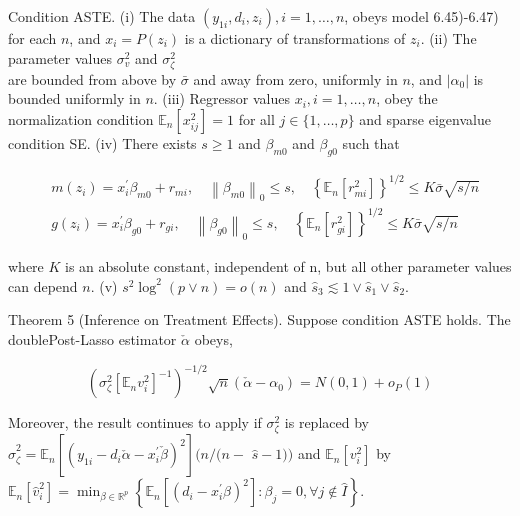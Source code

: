 \documentclass[10pt]{article}
\begin{document}
Condition ASTE. (i) The data \(\left(y_{1 i}, d_{i}, z_{i}\right), i=1, \ldots, n\), obeys model 6.45)-6.47) for each \(n\), and \(x_{i}=P\left(z_{i}\right)\) is a dictionary of transformations of \(z_{i}\). (ii) The parameter values \(\sigma_{v}^{2}\) and \(\sigma_{\zeta}^{2}\)\\
are bounded from above by \(\bar{\sigma}\) and away from zero, uniformly in \(n\), and \(\left|\alpha_{0}\right|\) is bounded uniformly in \(n\). (iii) Regressor values \(x_{i}, i=1, \ldots, n\), obey the normalization condition \(\mathbb{E}_{n}\left[x_{i j}^{2}\right]=1\) for all \(j \in\{1, \ldots, p\}\) and sparse eigenvalue condition SE. (iv) There exists \(s \geqslant 1\) and \(\beta_{m 0}\) and \(\beta_{g 0}\) such that

\[
\begin{aligned}
& m\left(z_{i}\right)=x_{i}^{\prime} \beta_{m 0}+r_{m i}, \quad\left\|\beta_{m 0}\right\|_{0} \leqslant s, \quad\left\{\mathbb{E}_{n}\left[r_{m i}^{2}\right]\right\}^{1 / 2} \leqslant K \bar{\sigma} \sqrt{s / n} \\
& g\left(z_{i}\right)=x_{i}^{\prime} \beta_{g 0}+r_{g i}, \quad\left\|\beta_{g 0}\right\|_{0} \leqslant s, \quad\left\{\mathbb{E}_{n}\left[r_{g i}^{2}\right]\right\}^{1 / 2} \leqslant K \bar{\sigma} \sqrt{s / n}
\end{aligned}
\]

where \(K\) is an absolute constant, independent of n, but all other parameter values can depend \(n\). (v) \(s^{2} \log ^{2}(p \vee n)=o(n)\) and \(\widehat{s}_{3} \lesssim 1 \vee \widehat{s}_{1} \vee \widehat{s}_{2}\).

Theorem 5 (Inference on Treatment Effects). Suppose condition ASTE holds. The doublePost-Lasso estimator \(\check{\alpha}\) obeys,

\[
\left(\sigma_{\zeta}^{2}\left[\mathbb{E}_{n} v_{i}^{2}\right]^{-1}\right)^{-1 / 2} \sqrt{n}\left(\check{\alpha}-\alpha_{0}\right)=N(0,1)+o_{P}(1)
\]

Moreover, the result continues to apply if \(\sigma_{\zeta}^{2}\) is replaced by \(\widehat{\sigma}_{\zeta}^{2}=\mathbb{E}_{n}\left[\left(y_{1 i}-d_{i} \check{\alpha}-x_{i}^{\prime} \check{\beta}\right)^{2}\right](n /(n-\) \(\widehat{s}-1))\) and \(\mathbb{E}_{n}\left[v_{i}^{2}\right]\) by \(\mathbb{E}_{n}\left[\widehat{v}_{i}^{2}\right]=\min _{\beta \in \mathbb{R}^{p}}\left\{\mathbb{E}_{n}\left[\left(d_{i}-x_{i}^{\prime} \beta\right)^{2}\right]: \beta_{j}=0, \forall j \notin \widehat{I}\right\}\).
\end{document}
